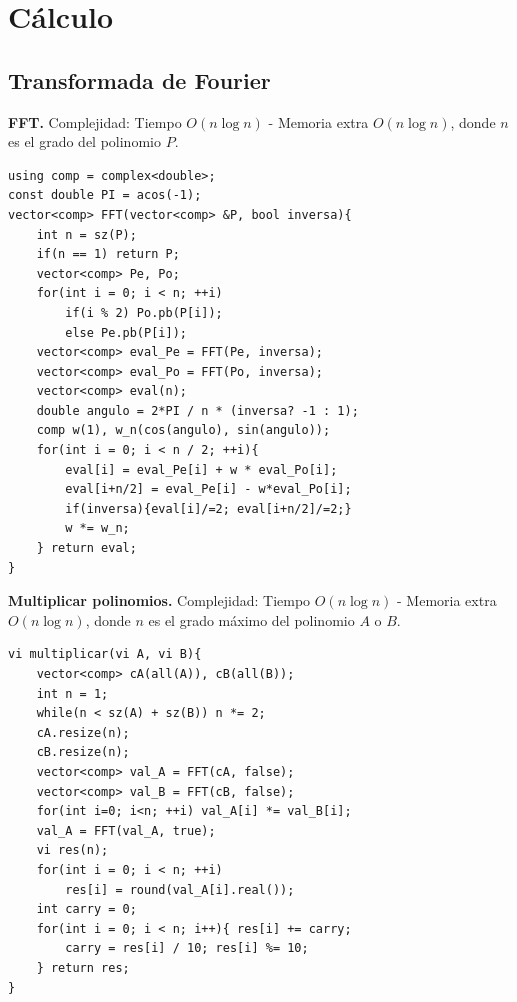 \section{Cálculo}

\subsection{Transformada de Fourier}
\textbf{FFT.} Complejidad: Tiempo $O(n\log n)$ - Memoria extra $O(n\log n)$, donde $n$ es el grado del polinomio $P$.
\begin{verbatim}
using comp = complex<double>;
const double PI = acos(-1);
vector<comp> FFT(vector<comp> &P, bool inversa){
    int n = sz(P);
    if(n == 1) return P;
    vector<comp> Pe, Po;
    for(int i = 0; i < n; ++i)
        if(i % 2) Po.pb(P[i]);
        else Pe.pb(P[i]);
    vector<comp> eval_Pe = FFT(Pe, inversa);
    vector<comp> eval_Po = FFT(Po, inversa);
    vector<comp> eval(n);
    double angulo = 2*PI / n * (inversa? -1 : 1);
    comp w(1), w_n(cos(angulo), sin(angulo));
    for(int i = 0; i < n / 2; ++i){
        eval[i] = eval_Pe[i] + w * eval_Po[i];
        eval[i+n/2] = eval_Pe[i] - w*eval_Po[i];
        if(inversa){eval[i]/=2; eval[i+n/2]/=2;}
        w *= w_n;
    } return eval;
}
\end{verbatim}



\textbf{Multiplicar polinomios.} Complejidad: Tiempo $O(n\log n)$ - Memoria extra $O(n\log n)$, donde $n$ es el grado máximo del polinomio $A$ o $B$.
\begin{verbatim}
vi multiplicar(vi A, vi B){
    vector<comp> cA(all(A)), cB(all(B));
    int n = 1;
    while(n < sz(A) + sz(B)) n *= 2;
    cA.resize(n);
    cB.resize(n);
    vector<comp> val_A = FFT(cA, false);
    vector<comp> val_B = FFT(cB, false);
    for(int i=0; i<n; ++i) val_A[i] *= val_B[i];
    val_A = FFT(val_A, true);
    vi res(n);
    for(int i = 0; i < n; ++i)
        res[i] = round(val_A[i].real());
    int carry = 0;
    for(int i = 0; i < n; i++){ res[i] += carry;
        carry = res[i] / 10; res[i] %= 10;
    } return res;
}
\end{verbatim}